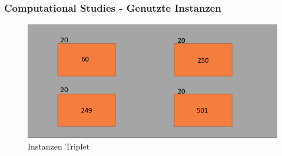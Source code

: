 \documentclass{beamer}
\begin{document}
%
\begin{frame}
\frametitle{Computational Studies - Genutzte Instanzen}
\begin{figure}[!htbp]
\begin{center}
\includegraphics[scale=0.25]{img/instance.png}
\end{center}
\caption{Instanzen Triplet}
\label{fig:architecture}
\end{figure}
\end{frame}
%
\end{document}
